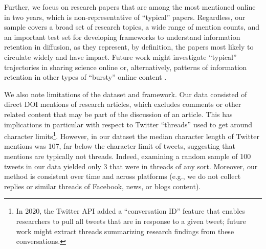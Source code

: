 \documentclass[letterpaper]{article} %
\begin{document}
Further, we focus on research papers that are among the most mentioned online in two years, which is non-representative of ``typical'' papers. Regardless, our sample covers a broad set of research topics, a wide range of mention counts, and an important test set for developing frameworks to understand information retention in diffusion, as they represent, by definition, the papers most likely to circulate widely and have impact. Future work might investigate ``typical'' trajectories in sharing science online \cite[similar to patterns of structural virality in][]{zakhlebinDiffusionScientificArticles2020} or, alternatively, patterns of information retention in other types of ``bursty'' online content \citep{gilbertWidespreadUnderprovisionReddit2013,chengCanCascadesBe2014,chengCascadesRecur2016}.

We also note limitations of the dataset and framework. Our data consisted of direct DOI mentions of research articles, which excludes comments or other related content that may be part of the discussion of an article. This has implications in particular with respect to Twitter ``threads'' used to get around character limits\footnote{In 2020, the Twitter API added a ``conversation ID'' feature that enables researchers to pull all tweets that are in response to a given tweet; future work might extract threads summarizing research findings from these conversations.}. However, in our dataset the median character length of Twitter mentions was 107, far below the character limit of tweets, suggesting that mentions are typically not threads. Indeed, examining a random sample of 100 tweets in our data yielded only 3 that were in threads of any sort. Moreover, our method is consistent over time and across platforms (e.g., we do not collect replies or similar threads of Facebook, news, or blogs content).
\end{document}
